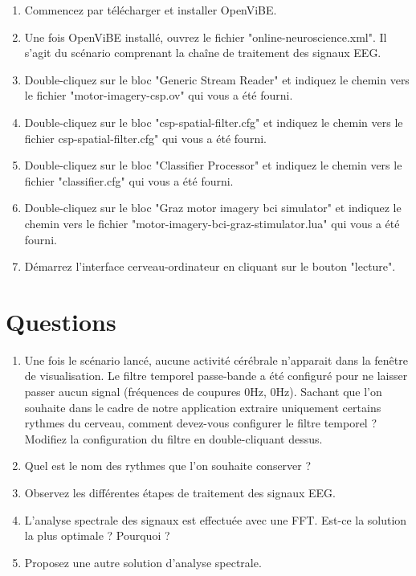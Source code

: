 \begin{enumerate}
	\smallbreak
	\item Commencez par télécharger et installer OpenViBE.
	\smallbreak
	\item Une fois OpenViBE installé, ouvrez le fichier "online-neuroscience.xml". Il s'agit du scénario comprenant la chaîne de traitement des signaux EEG. 
	\smallbreak
	\item Double-cliquez sur le bloc "Generic Stream Reader" et indiquez le chemin vers le fichier "motor-imagery-csp.ov" qui vous a été fourni. 
	\smallbreak
	\item Double-cliquez sur le bloc "csp-spatial-filter.cfg" et indiquez le chemin vers le fichier csp-spatial-filter.cfg" qui vous a été fourni. 
	\smallbreak
	\item Double-cliquez sur le bloc "Classifier Processor" et indiquez le chemin vers le fichier "classifier.cfg" qui vous a été fourni.
	\smallbreak
	\item Double-cliquez sur le bloc "Graz motor imagery bci simulator" et indiquez le chemin vers le fichier "motor-imagery-bci-graz-stimulator.lua" qui vous a été fourni.
	\smallbreak
	\item Démarrez l'interface cerveau-ordinateur en cliquant sur le bouton "lecture".
\end{enumerate}

\section*{Questions}

\begin{enumerate}
	\smallbreak
	\item Une fois le scénario lancé, aucune activité cérébrale n'apparait dans la fenêtre de visualisation. Le filtre temporel passe-bande a été configuré pour ne laisser passer aucun signal (fréquences de coupures 0Hz, 0Hz). Sachant que l'on souhaite dans le cadre de notre application extraire uniquement certains rythmes du cerveau, comment devez-vous configurer le filtre temporel ? Modifiez la configuration du filtre en double-cliquant dessus. 
	\smallbreak
	\item Quel est le nom des rythmes que l'on souhaite conserver ? 
	\smallbreak
	\item Observez les différentes étapes de traitement des signaux EEG. 
	\smallbreak
	\item L'analyse spectrale des signaux est effectuée avec une FFT. Est-ce la solution la plus optimale ? Pourquoi ? 
	\smallbreak
	\item Proposez une autre solution d'analyse spectrale. 
\end{enumerate}